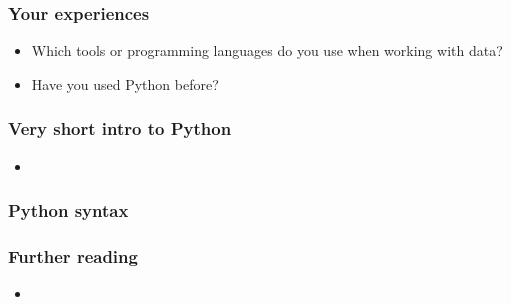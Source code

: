 
\begin{frame}
    \frametitle{Your experiences}
    \begin{itemize}
        \item Which tools or programming languages do you use when
        working with data?
        \item Have you used Python before?
    \end{itemize}
\end{frame}

\begin{frame}
    \frametitle{Very short intro to Python}
    \begin{itemize}
        \item
    \end{itemize}
\end{frame}

\begin{frame}
    \frametitle{Python syntax}
\end{frame}

\begin{frame}
    \frametitle{Further reading}
    \begin{itemize}
        \item
    \end{itemize}
\end{frame}
